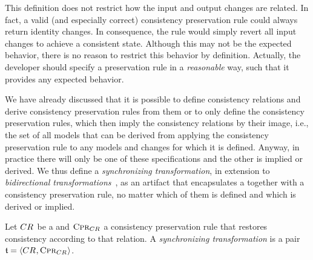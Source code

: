 This definition does not restrict how the input and output changes are related.
In fact, a valid (and especially correct) consistency preservation rule could always return identity changes.
In consequence, the rule would simply revert all input changes to achieve a consistent state.
Although this may not be the expected behavior, there is no reason to restrict this behavior by definition.
Actually, the developer should specify a preservation rule in a \emph{reasonable} way, such that it provides any expected behavior.


We have already discussed that it is possible to define consistency relations and derive consistency preservation rules from them or to only define the consistency preservation rules, which then imply the consistency relations by their image, i.e., the set of all models that can be derived from applying the consistency preservation rule to any models and changes for which it is defined.
Anyway, in practice there will only be one of these specifications and the other is implied or derived.
We thus define a \emph{synchronizing transformation}, in extension to \emph{bidirectional transformations}~\cite{stevens2010sosym}, as an artifact that encapsulates a \modellevelconsistencyrelation together with a consistency preservation rule, no matter which of them is defined and which is derived or implied.

\begin{definition}
    \label{def:synchronizingtransformation}
    Let $\consistencyrelation{CR}{}$ be a \modellevelconsistencyrelation and $\consistencypreservationrule{\consistencyrelation{CR}{}}$ a consistency preservation rule that restores consistency according to that relation.
    A \emph{synchronizing transformation} is a pair $\transformation{t} = \tupled{\consistencyrelation{CR}{}, \consistencypreservationrule{\consistencyrelation{CR}{}}}$.
\end{definition}


